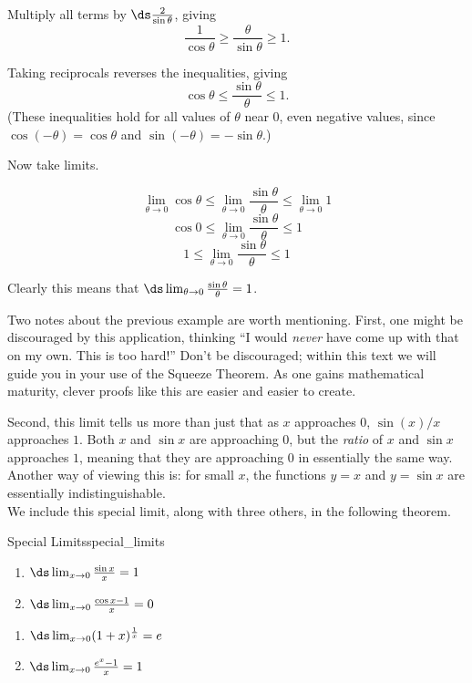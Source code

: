 \begin{solution}
{%

Multiply all terms by $\ds\frac{2}{\sin \theta}$, giving $$\frac{1}{\cos\theta} \geq \frac{\theta}{\sin \theta} \geq 1.$$

Taking reciprocals reverses the inequalities, giving $$ \cos \theta \leq \frac{\sin \theta}{\theta} \leq 1.$$ (These inequalities hold for all values of $\theta$ near 0, even negative values, since $\cos (-\theta) = \cos \theta$ and $\sin (-\theta) = -\sin \theta$.)

Now take limits.

$$\lim_{\theta\to 0} \cos \theta \leq \lim_{\theta\to 0} \frac{\sin\theta}{\theta} \leq \lim_{\theta\to 0}  1 $$
$$\cos 0 \leq \lim_{\theta\to 0} \frac{\sin\theta}{\theta} \leq  1 $$
$$1 \leq \lim_{\theta\to 0} \frac{\sin\theta}{\theta} \leq  1 $$

Clearly this means that $\ds \lim_{\theta\to 0} \frac{\sin\theta}{\theta}=1$.\\
}
\end{solution}





Two notes about the previous example are worth mentioning. First, one might be discouraged by this application, thinking ``I would \textit{never} have come up with that on my own. This is too hard!'' Don't be discouraged; within this text we will guide you in your use of the Squeeze Theorem. As one gains mathematical maturity, clever proofs like this are easier and easier to create.


Second, this limit tells us more than just that as $x$ approaches $ 0 $, $\sin(x)/x$ approaches $ 1 $. Both $x$ and $\sin x$ are approaching $ 0 $, but the \textit{ratio} of $x$ and $\sin x$ approaches $ 1 $, meaning that they are approaching $ 0 $ in essentially the same way. Another way of viewing this is: for small $x$, the functions $y=x$ and $y=\sin x$ are essentially indistinguishable.\\


We include this special limit, along with three others, in the following theorem.

\begin{theorem}{Special Limits}{special_limits}{%
\noindent\begin{minipage}[t]{.5\textwidth}
\begin{enumerate}
	\item		$\ds \lim_{x\to 0} \frac{\sin x}{x} = 1$
	\item		$\ds \lim_{x\to 0} \frac{\cos x-1}{x} = 0$
\end{enumerate}
\end{minipage}
\begin{minipage}[t]{.5\textwidth}
\begin{enumerate}\addtocounter{enumi}{2}
	\item		$\ds \lim_{x\to 0} (1+x)^\frac1x = e$
	\item		$\ds \lim_{x\to 0} \frac{e^x-1}{x} = 1$
\end{enumerate}
\end{minipage}
}
\end{theorem}


